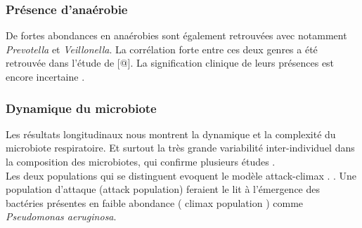 \documentclass[12pt,a4paper]{article}
\begin{document}
\subsubsection{Présence d'anaérobie}
De fortes abondances en anaérobies  sont également retrouvées avec notamment \textit{Prevotella} et \textit{Veillonella}. La corrélation forte  entre ces deux genres a été retrouvée dans l’étude de [@]. La signification clinique de leurs présences est encore incertaine \cite{Tunney2008}. 

\subsubsection{Dynamique du microbiote}
Les résultats longitudinaux nous montrent la dynamique et la complexité du microbiote respiratoire. Et surtout la très grande variabilité inter-individuel dans la composition des microbiotes, qui confirme plusieurs études \cite{Coburn2015}.  \\
Les deux populations qui se distinguent evoquent le modèle attack-climax \cite{Conrad2013}. . Une population d'attaque (attack population) feraient le lit à l'émergence des bactéries présentes en faible abondance ( climax population ) comme \textit{Pseudomonas aeruginosa}.  
\end{document}
